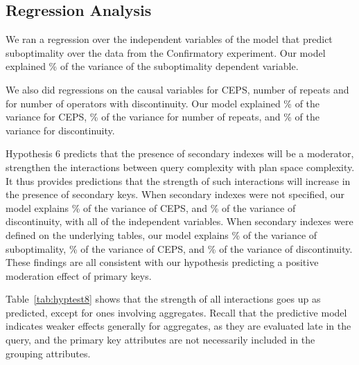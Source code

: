 \documentclass[prodmode,acmtods]{acmsmall}
\begin{document}
\subsection{Regression Analysis}\label{sec:regression}
We ran a regression over the independent variables of the
model that predict suboptimality over the data from the Confirmatory experiment. 
Our model explained \% of the variance of the suboptimality dependent
variable.

We also did regressions on the causal variables for CEPS, number of repeats and for number of
operators with discontinuity. Our model explained \% of the
variance for CEPS, \% of the variance for number of repeats, and \% of the variance for
discontinuity.  

Hypothesis 6 predicts that the presence of secondary indexes will be a moderator,
strengthen the interactions between query complexity with plan space
complexity. It thus provides
predictions that the strength of such interactions will increase in the
presence of secondary keys. When
secondary indexes were not specified, our model explains 
 \% of the variance of CEPS, and \% of the variance
of discontinuity, with all of the independent variables. When
secondary indexes were defined on the underlying tables, our model explains
\% of the variance of suboptimality, \% of the variance of CEPS, and
\% of the variance of discontinuity. These findings are all consistent with our
hypothesis predicting a positive moderation effect of primary keys.

Table~\ref{tab:hyptest8} shows that the strength of all interactions goes
up as predicted, except for ones involving aggregates. Recall
that the predictive model indicates weaker effects generally for aggregates,
as they are evaluated late in the query, and the primary key attributes are
not necessarily included in the grouping attributes.
\end{document}
